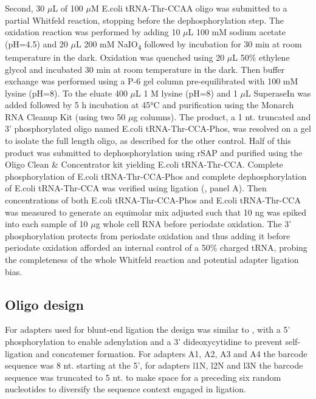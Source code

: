 \documentclass[9pt,lineno]{elife}
\begin{document}
Second, 30 $\mu$L of 100 $\mu$M E.coli tRNA-Thr-CCAA oligo was submitted to a partial Whitfeld reaction, stopping before the dephosphorylation step.
The oxidation reaction was performed by adding 10 $\mu$L 100 mM sodium acetate (pH=4.5) and 20 $\mu$L 200 mM NaIO\textsubscript{4} followed by incubation for 30 min at room temperature in the dark.
Oxidation was quenched using 20 $\mu$L 50\% ethylene glycol and incubated 30 min at room temperature in the dark.
Then buffer exchange was performed using a P-6 gel column pre-equilibrated with 100 mM lysine (pH=8).
To the eluate 400 $\mu$L 1 M lysine (pH=8) and 1 $\mu$L SuperaseIn was added followed by 5 h incubation at 45°C and purification using the Monarch RNA Cleanup Kit (using two 50 $\mu$g columns).
The product, a 1 nt. truncated and 3’ phosphorylated oligo named E.coli tRNA-Thr-CCA-Phos, was resolved on a gel to isolate the full length oligo, as described for the other control.
Half of this product was submitted to dephosphorylation using rSAP and purified using the Oligo Clean \& Concentrator kit yielding E.coli tRNA-Thr-CCA.
Complete phosphorylation of E.coli tRNA-Thr-CCA-Phos and complete dephosphorylation of E.coli tRNA-Thr-CCA was verified using ligation (, panel A).
Then concentrations of both E.coli tRNA-Thr-CCA-Phos and E.coli tRNA-Thr-CCA was measured to generate an equimolar mix adjusted such that 10 ng was spiked into each sample of 10 $\mu$g whole cell RNA before periodate oxidation.
The 3’ phosphorylation protects from periodate oxidation and thus adding it before periodate oxidation afforded an internal control of a 50\% charged tRNA, probing the completeness of the whole Whitfeld reaction and potential adapter ligation bias.



\subsection{Oligo design}
For adapters used for blunt-end ligation the design was similar to \cite{McGlincy2017-ro}, with a 5’ phosphorylation to enable adenylation and a 3’ dideoxycytidine to prevent self-ligation and concatemer formation.
For adapters A1, A2, A3 and A4 the barcode sequence was 8 nt. starting at the 5’, for adapters l1N, l2N and l3N the barcode sequence was truncated to 5 nt. to make space for a preceding six random nucleotides to diversify the sequence context engaged in ligation.
\end{document}
